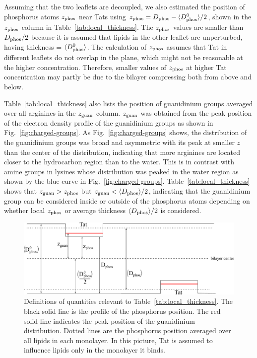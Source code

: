 Assuming that the two leaflets are decoupled, we also estimated the position
of phosphorus atoms $z_\textrm{phos}$ near Tats 
using $z_\textrm{phos} = D_\text{phos} - \langle D_\text{phos}^0\rangle/2$, shown in the $z_\textrm{phos}$ column
in Table~\ref{tab:local_thickness}. 
The $z_\textrm{phos}$ values are smaller than $D_\text{phos} /2$
because it is assumed that lipids in the other leaflet are unperturbed,
having thickness = $\langle D_\text{phos}^0\rangle$.
The calculation of $z_\textrm{phos}$ assumes that Tat in different leaflets do not
overlap in the plane, which might not be reasonable at the higher concentration.
Therefore, smaller values of $z_\textrm{phos}$ at higher Tat concentration
may partly be due to the bilayer compressing both from above and below.

Table~\ref{tab:local_thickness} also lists
the position of guanidinium groups averaged
over all arginines in the $z_\textrm{guan}$ column. $z_\textrm{guan}$ was obtained
from the peak position of the electron density profile of the guanidinium groups 
as shown in Fig.~\ref{fig:charged-groups}. As Fig.~\ref{fig:charged-groups} shows,
the distribution of the guanidinium groups was broad and 
asymmetric with its peak at smaller $z$ than the center
of the distribution, indicating that more arginines are located closer to the
hydrocarbon region than to the water. This is in contrast with amine groups
in lysines whose distribution was peaked in the water region as shown by
the blue curve in Fig.~\ref{fig:charged-groups}.
Table~\ref{tab:local_thickness} shows that $z_\textrm{guan} > z_\textrm{phos}$ but
$z_\textrm{guan} < \langle D_\text{phos}\rangle/2$, indicating that the guanidinium group 
can be considered inside or outside of the phosphorus atoms depending on
whether local $z_\textrm{phos}$ or average thickness $\langle D_\text{phos}\rangle/2$ is considered.

\begin{figure}[htbp]
  \centering
  \includegraphics[width=\textwidth]{figures/Tat/MD_Results/dimensions}
  \caption[Definitions of quantities relevant to Table~\ref{tab:local_thickness}]
  {Definitions of quantities relevant to Table~\ref{tab:local_thickness}.
  The black solid line is the profile of the phosphorus position.
  The red solid line indicates the peak position of the guanidinium 
  distribution. Dotted lines are the phosphorus position averaged over all
  lipids in each monolayer. In this picture, Tat is assumed to influence
  lipids only in the monolayer it binds.}
  \label{fig:Dphos_dimensions}
\end{figure} 

